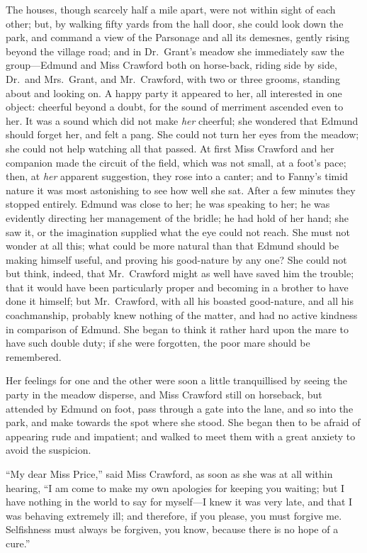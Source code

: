 \documentclass{article}
\begin{document}
The houses, though scarcely half a mile apart, were not
within sight of each other; but, by walking fifty yards
from the hall door, she could look down the park,
and command a view of the Parsonage and all its demesnes,
gently rising beyond the village road; and in Dr.\ Grant's
meadow she immediately saw the group---Edmund and Miss
Crawford both on horse-back, riding side by side, Dr.\ and
Mrs.\ Grant, and Mr.\ Crawford, with two or three grooms,
standing about and looking on.  A happy party it appeared
to her, all interested in one object:  cheerful beyond
a doubt, for the sound of merriment ascended even to her.
It was a sound which did not make \emph{her} cheerful;
she wondered that Edmund should forget her, and felt
a pang.  She could not turn her eyes from the meadow;
she could not help watching all that passed.  At first Miss
Crawford and her companion made the circuit of the field,
which was not small, at a foot's pace; then, at \emph{her}
apparent suggestion, they rose into a canter; and to Fanny's
timid nature it was most astonishing to see how well
she sat.  After a few minutes they stopped entirely.
Edmund was close to her; he was speaking to her;
he was evidently directing her management of the bridle;
he had hold of her hand; she saw it, or the imagination
supplied what the eye could not reach.  She must not
wonder at all this; what could be more natural than that
Edmund should be making himself useful, and proving his
good-nature by any one?  She could not but think, indeed,
that Mr.\ Crawford might as well have saved him the trouble;
that it would have been particularly proper and becoming
in a brother to have done it himself; but Mr.\ Crawford,
with all his boasted good-nature, and all his coachmanship,
probably knew nothing of the matter, and had no active
kindness in comparison of Edmund. She began to think it
rather hard upon the mare to have such double duty;
if she were forgotten, the poor mare should be remembered.

Her feelings for one and the other were soon a little
tranquillised by seeing the party in the meadow disperse,
and Miss Crawford still on horseback, but attended by Edmund
on foot, pass through a gate into the lane, and so into
the park, and make towards the spot where she stood.
She began then to be afraid of appearing rude and impatient;
and walked to meet them with a great anxiety to avoid
the suspicion.

``My dear Miss Price,'' said Miss Crawford, as soon as she
was at all within hearing, ``I am come to make my own
apologies for keeping you waiting; but I have nothing
in the world to say for myself---I knew it was very late,
and that I was behaving extremely ill; and therefore,
if you please, you must forgive me.  Selfishness must
always be forgiven, you know, because there is no hope
of a cure.''
\end{document}
